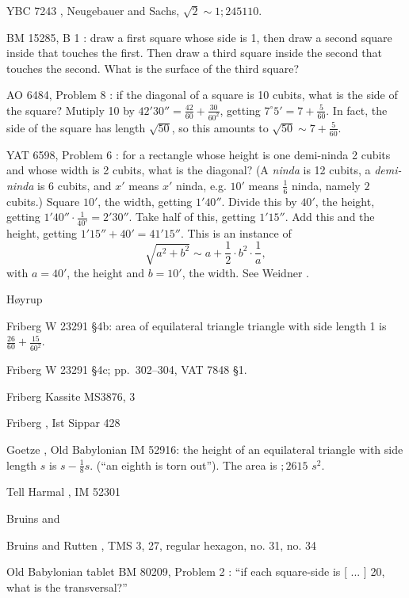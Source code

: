 \documentclass{amsart}
\theoremstyle{definition}
\begin{document}
YBC 7243 \cite[pp.~136--139]{cuneiform}, Neugebauer and Sachs, $\sqrt{2} \sim 1;24 51 10$.

BM 15285, B 1 \cite[p.~54]{thureau-dangin}: draw a first square whose side is 1, then draw 
a second square inside that touches the first. Then draw a third square inside the second that touches the second. 
What is the surface of the third square?

AO 6484, Problem 8 \cite[p.~78]{thureau-dangin}: if the diagonal of a square is 10 cubits, what is the side of the square?
Mutiply 10 by $42'30'' = \frac{42}{60}+\frac{30}{60^2}$, getting
$7^\circ 5'=7+\frac{5}{60}$. In fact, the side of the square has length $\sqrt{50}$, so
this amounts to $\sqrt{50} \sim 7+\frac{5}{60}$. 

YAT 6598, Problem 6 \cite[p.~130]{thureau-dangin}: 
for a rectangle whose height is one demi-ninda  2 cubits and  whose width is 2 cubits, what is the diagonal?
(A  {\em ninda} is 12 cubits, a {\em demi-ninda} is 6 cubits, and $x'$ means $x'$ ninda, e.g.
$10'$ means $\frac{1}{6}$ ninda, namely $2$ cubits.) 
Square $10'$, the width, getting $1'40''$.
Divide this by  $40'$, the height, getting $1'40'' \cdot \frac{1}{40'} = 2'30''$. Take half of this, getting
$1'15''$. Add this and the height, getting  $1'15'' + 40'=41'15''$. This is an instance
of
\[
\sqrt{a^2+b^2} \sim a + \frac{1}{2} \cdot b^2 \cdot \frac{1}{a},
\]
with $a=40'$, the height and  $b=10'$, the width. See Weidner \cite{weidner}.

H{\o}yrup \cite{hoyrup}

Friberg \cite{friberg1997} W 23291 \S 4b: area of equilateral triangle triangle with side length 1 is $\frac{26}{60}+\frac{15}{60^2}$. 

Friberg \cite[p.~286]{friberg1997} W 23291 \S 4c; pp.~302--304, VAT 7848 \S 1.

Friberg \cite{friberg} Kassite MS3876, 3

Friberg \cite[p.~548]{reallexikon7}, Ist Sippar 428

Goetze \cite{goetze}, Old Babylonian IM 52916: the height of an equilateral triangle with side length $s$ is $s-\frac{1}{8}s$. (``an eighth is torn out''). The area is
$;26 15$ $s^2$.

Tell Harmal \cite{TellHarmal}, IM 52301

Bruins \cite{bruins1948} and \cite{bruins1950}

Bruins and Rutten \cite{suse}, TMS 3, 27, regular hexagon, no. 31, no. 34

Old Babylonian tablet BM 80209, Problem 2 \cite{BM80209}:  ``if each square-side is [ ... ] 20, what is the transversal?''
\end{document}
